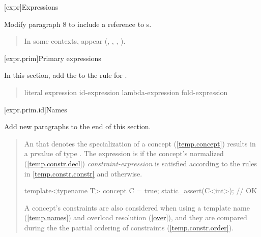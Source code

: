 

\setcounter{chapter}{7}
[expr]{Expressions}

Modify paragraph 8 to include a reference to s.

\begin{quote}
\pnum
In some contexts,  appear
(\added{\ref{expr.prim.req}, }, , 
, ).
\end{quote}

[expr.prim]{Primary expressions}

In this section, add the
 to the rule for 
.

\begin{quote}
\begin{bnf}
\br
    literal\br
    \br
    \terminal{(} expression \terminal{)}\br
    id-expression\br
    lambda-expression\br
    fold-expression\br
\end{bnf}
\end{quote}

\setcounter{subsection}{3}
[expr.prim.id]{Names}

Add new paragraphs to the end of this 
section.

\setcounter{Paras}{2}

\begin{quote}
\begin{addedblock}
\pnum
An  that denotes the specialization of a concept
(\ref{temp.concept}) results in a prvalue of type . 
%
The expression is  if the concept's normalized 
(\ref{temp.constr.decl}) \emph{constraint-expression} is satisfied according
to the rules in \ref{temp.constr.constr} and  otherwise.
\enterexample
\begin{codeblock}
template<typename T> concept C = true;
static_assert(C<int>); // OK
\end{codeblock}
\exitexample
\enternote
A concept's constraints are also considered when using a template name
(\ref{temp.names}) and overload resolution (\ref{over}), and they are
compared during the the partial ordering of constraints 
(\ref{temp.constr.order}).
\exitnote

\end{addedblock}
\end{quote}

